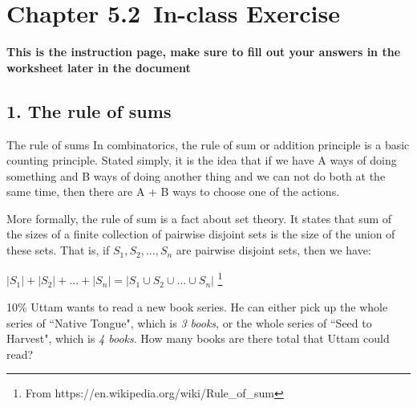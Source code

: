 \documentclass[a4paper,12pt]{book}
\title{}
\author{Rachel Morris}
\date{\today}
\newcommand{\laChapter}{5.2\ }
\begin{document}
    \togglefalse{answerkey}

    
    \chapter*{Chapter \laChapter In-class Exercise} 
    

    \begin{center}
        \textbf{This is the instruction page, 
        make sure to fill out your answers in the \textbf{worksheet} later in the document}
    \end{center}

    \section*{1. The rule of sums}

        \begin{intro}{The rule of sums}
        In combinatorics, the rule of sum or addition principle is a basic counting principle. Stated simply, it is the idea that if we have A ways of doing something and B ways of doing another thing and we can not do both at the same time, then there are A + B ways to choose one of the actions.

        More formally, the rule of sum is a fact about set theory. It states that sum of the sizes of a finite collection of pairwise disjoint sets is the size of the union of these sets. That is, if
        $S_{1}, S_{2}, ..., S_{n}$ are pairwise disjoint sets, then we have:

        $|S_{1}| + |S_{2}| + ... + |S_{n}| = |S_{1} \cup S_{2} \cup ... \cup S_{n}|$
        \footnote{From https://en.wikipedia.org/wiki/Rule\_of\_sum}
        \end{intro}

        \begin{question}{1}{10\%}
            Uttam wants to read a new book series. He can either pick up
            the whole series of ``Native Tongue", which is \textit{3 books},
            or the whole series
            of ``Seed to Harvest", which is \textit{4 books}. How many books are there total
            that Uttam could read?
        \end{question}
\end{document}
